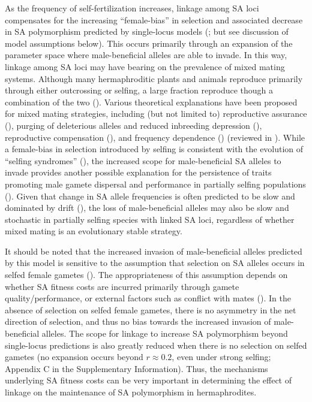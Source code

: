 \documentclass{article}
\begin{document}
As the frequency of self-fertilization increases, linkage among SA loci compensates for the increasing ``female-bias'' in selection and associated decrease in SA polymorphism predicted by single-locus models (\citealt{Charlesworth1978, JordanConn2014}; but see discussion of model assumptions below). This occurs primarily through an expansion of the parameter space where male-beneficial alleles are able to invade. In this way, linkage among SA loci may have bearing on the prevalence of mixed mating systems. Although many hermaphroditic plants and animals reproduce primarily through either outcrossing or selfing, a large fraction reproduce though a combination of the two (\citealt{JarneAuld2006, Goodwillie2005, Igic2005}). Various theoretical explanations have been proposed for mixed mating strategies, including (but not limited to) reproductive assurance (\citealt{Lloyd1979}), purging of deleterious alleles and reduced inbreeding depression (\citealt{LandeSchemske1985}), reproductive compensation (\citealt{HarderRoutley2007, PorcherLande2005}), and frequency dependence (\citealt{Holsinger1991}) (reviewed in \citealt{Goodwillie2005, HarderBarrett2006}). While a female-bias in selection introduced by selfing is consistent with the evolution of ``selfing syndromes'' (\citealt{Sicard2011}), the increased scope for male-beneficial SA alleles to invade provides another possible explanation for the persistence of traits promoting male gamete dispersal and performance in partially selfing populations (\citealt{Barrett2002, Goodwillie2005, HarderBarrett2006}). Given that change in SA allele frequencies is often predicted to be slow and dominated by drift (\citealt{ConnClark2011, ConnClark2012, ConnClark2014}), the loss of male-beneficial alleles may also be slow and stochastic in partially selfing species with linked SA loci, regardless of whether mixed mating is an evolutionary stable strategy.

It should be noted that the increased invasion of male-beneficial alleles predicted by this model is sensitive to the assumption that selection on SA alleles occurs in selfed female gametes (\citealt{Tazzyman2015}). The appropriateness of this assumption depends on whether SA fitness costs are incurred primarily through gamete quality/performance, or external factors such as conflict with mates (\citealt{Tazzyman2015}). In the absence of selection on selfed female gametes, there is no asymmetry in the net direction of selection, and thus no bias towards the increased invasion of male-beneficial alleles. The scope for linkage to increase SA polymorphism beyond single-locus predictions is also greatly reduced when there is no selection on selfed gametes (no expansion occurs beyond $r \approx 0.2$, even under strong selfing; Appendix C in the Supplementary Information). Thus, the mechanisms underlying SA fitness costs can be very important in determining the effect of linkage on the maintenance of SA polymorphism in hermaphrodites.
\end{document}
